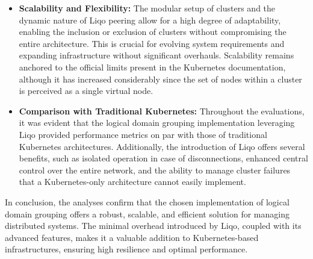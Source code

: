 \begin{itemize}
\item \textbf{Scalability and Flexibility:} The modular setup of clusters and the dynamic nature of Liqo peering allow for a high degree of adaptability, enabling the inclusion or exclusion of clusters without compromising the entire architecture. This is crucial for evolving system requirements and expanding infrastructure without significant overhauls. Scalability remains anchored to the official limits present in the Kubernetes documentation, although it has increased considerably since the set of nodes within a cluster is perceived as a single virtual node.

\item \textbf{Comparison with Traditional Kubernetes:} Throughout the evaluations, it was evident that the logical domain grouping implementation leveraging Liqo provided performance metrics on par with those of traditional Kubernetes architectures. Additionally, the introduction of Liqo offers several benefits, such as isolated operation in case of disconnections, enhanced central control over the entire network, and the ability to manage cluster failures that a Kubernetes-only architecture cannot easily implement.
\end{itemize}

In conclusion, the analyses confirm that the chosen implementation of logical domain grouping  offers a robust, scalable, and efficient solution for managing distributed systems. The minimal overhead introduced by Liqo, coupled with its advanced features, makes it a valuable addition to Kubernetes-based infrastructures, ensuring high resilience and optimal performance.
